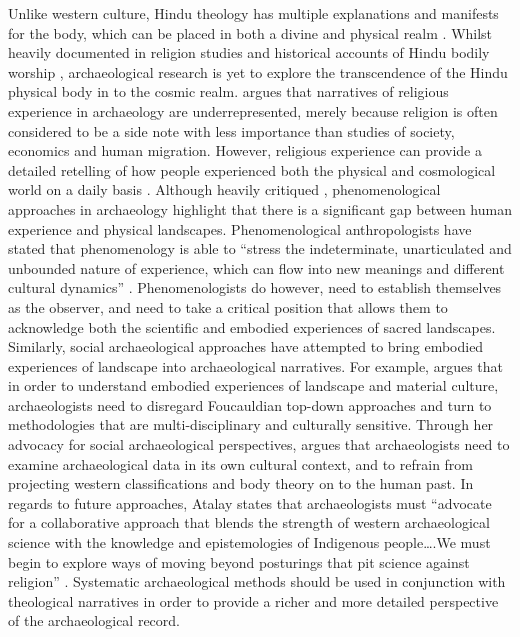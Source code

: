 Unlike  western culture, Hindu theology has multiple explanations and manifests for the body, which can be placed in both a divine and physical realm \parencite {Holdrege_2007}. Whilst heavily documented in religion studies and historical accounts of Hindu bodily worship \parencites{Beck_1976}{Smith_1989}{Staal_1993}, archaeological research is yet to explore the transcendence of the Hindu physical body in to the cosmic realm. \textcite[155] {Insoll_2004} argues that narratives of religious experience in archaeology are underrepresented, merely because religion is often considered to be a side note with less importance than studies of society, economics and human migration. However, religious experience can provide a detailed retelling of how people experienced both the physical and cosmological world on a daily basis \parencites{Edwards_2005}{Hamilakis_2002}{Insoll_2004}. Although heavily critiqued \parencite{Fleming_2006}, phenomenological approaches in archaeology highlight that there is a significant gap between human experience and physical landscapes. Phenomenological anthropologists have stated that phenomenology is able to “stress the indeterminate, unarticulated and unbounded nature of experience, which can flow into new meanings and different cultural dynamics” \parencite[50]{Knibbe_2008}. Phenomenologists do however, need to establish themselves as the observer, and need to take a critical position that allows them to acknowledge both the scientific and embodied experiences of sacred landscapes. Similarly, social archaeological approaches have attempted to bring embodied experiences of landscape into archaeological narratives. For example, \textcite {Meskell_1996, Meskell_1998, Meskell_2000}  argues that in order to understand embodied experiences of landscape and material culture, archaeologists need to disregard Foucauldian top-down approaches and turn to methodologies that are multi-disciplinary and culturally sensitive. Through her advocacy for social archaeological perspectives,\textcites{Meskell_1996}{Meskell_1998}{Meskell_2000} argues that archaeologists need to examine archaeological data in its own cultural context, and to refrain from projecting western classifications and body theory on to the human past. In regards to future approaches, Atalay states that archaeologists must “advocate for a collaborative approach that blends the strength of western archaeological science with the knowledge and epistemologies of Indigenous people….We must begin to explore ways of moving beyond posturings that pit science against religion” \parencite [301-302] {Atalay_2006}. Systematic archaeological methods should be used in conjunction with theological narratives in order to provide a richer and more detailed perspective of the archaeological record.

